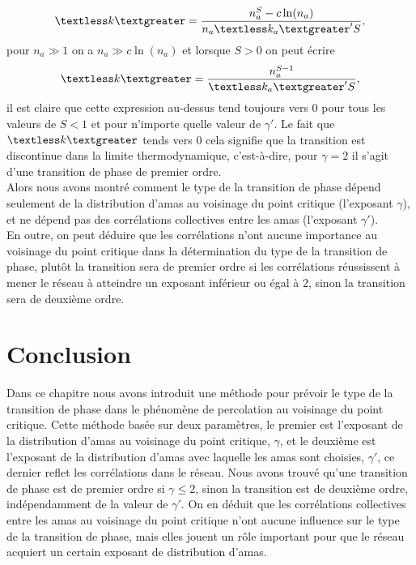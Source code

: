  \begin{equation}
 \km=\frac{n_a^S-c\ln(n_a)}{n_a\kma' S},
 \end{equation}
  pour $n_a\gg1$ on a $n_a\gg c\ln(n_a)$ et lorsque $S>0$ on peut écrire
  \begin{equation}
  \km=\frac{n_a^{S-1}}{\kma' S},
  \end{equation}
  il est claire que cette expression au-dessus tend toujours vers $0$ pour tous les valeurs de $S<1$ et pour n'importe quelle valeur de $\gamma'$. Le fait que $\km$ tends vers $0$ cela signifie que la transition est discontinue dans la limite thermodynamique, c'est-à-dire, pour $\gamma=2$ il s'agit d'une transition de phase de premier ordre.\\
  Alors nous avons montré comment le type de la transition de phase dépend seulement de la distribution d'amas au voisinage du point critique (l'exposant $\gamma$), et ne dépend pas des corrélations collectives entre les amas (l'exposant $\gamma'$). \\ 
  En outre, on peut déduire que les corrélations n'ont aucune importance au voisinage du point critique dans la détermination du type de la transition de phase, plutôt  la transition sera de premier ordre si les corrélations réussissent à mener le réseau à atteindre un exposant inférieur ou égal à $2$, sinon la transition sera de deuxième ordre. 
\section{Conclusion}
Dans ce chapitre nous avons introduit une méthode pour prévoir  le type de la transition de phase dans le phénomène de percolation au voisinage du point critique. Cette méthode basée sur deux paramètres, le premier est l'exposant de la distribution d'amas au voisinage du point critique, $\gamma$, et le deuxième est l'exposant de la distribution d'amas avec laquelle les amas sont choisies, $\gamma'$, ce dernier reflet les corrélations dans le réseau. Nous avons trouvé qu'une transition de phase est de premier ordre si $\gamma\leq2$, sinon la transition est de deuxième ordre, indépendamment de la valeur de $\gamma'$. On en déduit que les corrélations collectives entre les amas au voisinage du point critique n'ont aucune influence sur le type de la transition de phase, mais elles jouent un rôle important pour que le réseau acquiert un certain exposant de distribution d'amas.   

